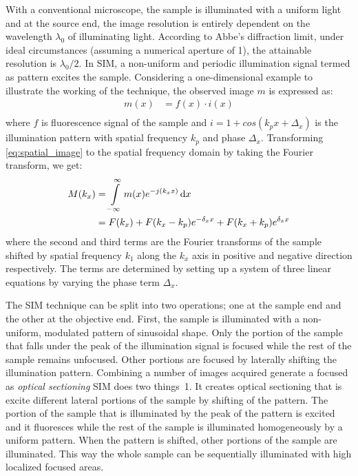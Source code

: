 \documentclass[11pt]{article}
\begin{document}
With a conventional microscope, the sample is illuminated with a uniform light and at the source end, the image resolution is entirely dependent on the wavelength $\lambda_0$ of illuminating light. According to Abbe's diffraction limit, under ideal circumstances (assuming a numerical aperture of 1), the attainable resolution is $\lambda_0/2$. In SIM, a non-uniform and periodic illumination signal termed as pattern excites the sample. Considering a one-dimensional example to illustrate the working of the technique, the observed image $m$ is expressed as:
\begin{equation}
  \begin{split}
    m(x) &= f(x) \cdot i(x) \\
  \end{split}
  \label{eq:spatial_image}
\end{equation}
%
where $f$ is fluorescence signal of the sample and $i = 1 + cos(k_p x + \Delta_x)$ is the illumination pattern with spatial frequency $k_p$ and phase $\Delta_x$. Transforming \eqref{eq:spatial_image} to the spatial frequency domain by taking the Fourier transform, we get:
\begin{equation}
  \begin{split}
    M(k_x) &= \int \limits_{-\infty}^{\infty}   m(x) e^{-j(k_x x)} \mathop{}\!\mathrm{d}{x} \\
    &=   F(k_x) + F(k_x - k_p)e^{-\delta_x x} +  F(k_x + k_p)e^{ \delta_x x}
  \end{split}
  \label{eq:spatial_image}
\end{equation}
%
where the second and third terms are the Fourier transforms of the sample shifted by spatial frequency $k_1$ along the $k_x$ axis in positive and negative direction respectively. The terms are determined by setting up a system of three linear equations by varying the phase term $\Delta_x$.






The SIM technique can be split into two operations; one at the sample end and the other at the objective end. First, the sample is illuminated with a non-uniform, modulated pattern of sinusoidal shape. Only the portion of the sample that falls under the peak of the illumination signal is focused while the rest of the sample remains unfocused. Other portions are focused by laterally shifting the illumination pattern. Combining a number of images acquired generate a focused  as \emph{optical sectioning}
SIM does two things\
1. It creates optical sectioning that is excite different lateral portions of the sample by shifting of the pattern. The portion of the sample that is illuminated by the peak of the pattern is excited and it fluoresces while the rest of the sample is illuminated homogeneously by a uniform pattern. When the pattern is shifted, other portions of the sample are illuminated. This way the whole sample can be sequentially illuminated with high localized focused areas.
\end{document}
